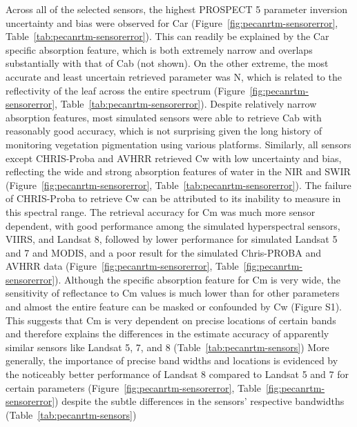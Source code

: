 Across all of the selected sensors, the highest PROSPECT 5 parameter inversion uncertainty and bias were observed for Car (Figure~\ref{fig:pecanrtm-sensorerror}, Table~\ref{tab:pecanrtm-sensorerror}).
This can readily be explained by the Car specific absorption feature, which is both extremely narrow and overlaps substantially with that of Cab (not shown).%
On the other extreme, the most accurate and least uncertain retrieved parameter was N, which is related to the reflectivity of the leaf across the entire spectrum (Figure~\ref{fig:pecanrtm-sensorerror}, Table~\ref{tab:pecanrtm-sensorerror}).%
Despite relatively narrow absorption features, most simulated sensors were able to retrieve Cab with reasonably good accuracy, which is not surprising given the long history of monitoring vegetation pigmentation using various platforms.
Similarly, all sensors except CHRIS-Proba and AVHRR retrieved Cw with low uncertainty and bias, reflecting the wide and strong absorption features of water in the NIR and SWIR (Figure~\ref{fig:pecanrtm-sensorerror}, Table~\ref{tab:pecanrtm-sensorerror}).%
The failure of CHRIS-Proba to retrieve Cw can be attributed to its inability to measure in this spectral range.%
The retrieval accuracy for Cm was much more sensor dependent, with good performance among the simulated hyperspectral sensors, VIIRS, and Landsat 8, followed by lower performance for simulated Landsat 5 and 7 and MODIS, and a poor result for the simulated Chris-PROBA and AVHRR data (Figure~\ref{fig:pecanrtm-sensorerror}, Table~\ref{fig:pecanrtm-sensorerror}).
Although the specific absorption feature for Cm is very wide, the sensitivity of reflectance to Cm values is much lower than for other parameters and almost the entire feature can be masked or confounded by Cw (Figure S1). %
This suggests that Cm is very dependent on precise locations of certain bands and therefore explains the differences in the estimate accuracy of apparently similar sensors like Landsat 5, 7, and 8 (Table~\ref{tab:pecanrtm-sensors})%
More generally, the importance of precise band widths and locations is evidenced by the noticeably better performance of Landsat 8 compared to Landsat 5 and 7 for certain parameters (Figure~\ref{fig:pecanrtm-sensorerror}, Table~\ref{fig:pecanrtm-sensorerror}) despite the subtle differences in the sensors’ respective bandwidths (Table~\ref{tab:pecanrtm-sensors})%

